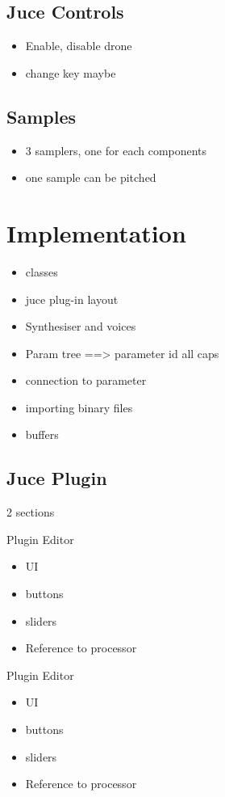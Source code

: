 \documentclass[12pt]{article}
\begin{document}
	\subsection{Juce Controls}
	\begin{itemize}
		\item Enable, disable drone
		\item change key maybe
	\end{itemize}
	
	\subsection{Samples}
	\begin{itemize}
		\item 3 samplers, one for each components
		\item one sample can be pitched
	\end{itemize}
	
		
\section{Implementation}
	
	\begin{itemize}
		\item classes
		\item juce plug-in layout
		\item Synthesiser and voices
		\item Param tree ==> parameter id all caps
		\item connection to parameter
		\item importing binary files
		\item buffers
	\end{itemize}

	\subsection{Juce Plugin}
	2 sections
	
	Plugin Editor
	\begin{itemize}
		\item UI
		\item buttons
		\item sliders
		\item Reference to processor
	\end{itemize}
	
	
	Plugin Editor
	\begin{itemize}
		\item UI
		\item buttons
		\item sliders
		\item Reference to processor
	\end{itemize}
	
\end{document}
